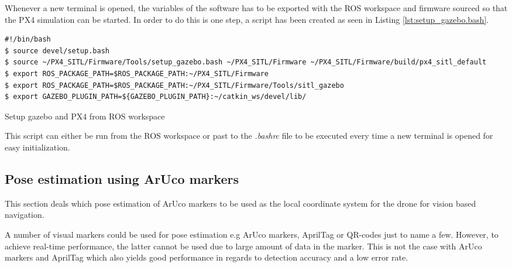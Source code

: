 \documentclass[../Head/report.tex]{subfiles}
\begin{document}
Whenever a new terminal is opened, the variables of the software has to be exported with the ROS workspace and firmware sourced so that the PX4 simulation can be started. In order to do this is one step, a script has been created as seen in Listing \ref{lst:setup_gazebo.bash}. 

\begin{listing}[H] 
\begin{tcolorbox}[
    enhanced,
    attach boxed title to top left={xshift=6mm,yshift=-3mm},
    colback=lightgreen!20,
    colframe=lightgreen,
    fonttitle=\bfseries\color{black},
]
\begin{verbatim}
#!/bin/bash
$ source devel/setup.bash
$ source ~/PX4_SITL/Firmware/Tools/setup_gazebo.bash ~/PX4_SITL/Firmware ~/PX4_SITL/Firmware/build/px4_sitl_default
$ export ROS_PACKAGE_PATH=$ROS_PACKAGE_PATH:~/PX4_SITL/Firmware
$ export ROS_PACKAGE_PATH=$ROS_PACKAGE_PATH:~/PX4_SITL/Firmware/Tools/sitl_gazebo
$ export GAZEBO_PLUGIN_PATH=${GAZEBO_PLUGIN_PATH}:~/catkin_ws/devel/lib/
\end{verbatim}
\end{tcolorbox}
\caption{Setup gazebo and PX4 from ROS workspace}
\label{lst:setup_gazebo.bash}    
\end{listing}  

This script can either be run from the ROS workspace or past to the \textit{.bashrc} file to be executed every time a new terminal is opened for easy initialization. 


\subsection{Pose estimation using ArUco markers}
\label{sec:pose_estimation_using_aruco_markers}


This section deals which pose estimation of ArUco markers to be used as the local coordinate system for the drone for vision based navigation. 

A number of visual markers could be used for pose estimation e.g ArUco markers, AprilTag or QR-codes just to name a few. However, to achieve real-time performance, the latter cannot be used due to large amount of data in the marker. This is not the case with ArUco markers and AprilTag which also yields good performance in regards to detection accuracy and a low error rate. \cite{visualmarkers} 
\end{document}
